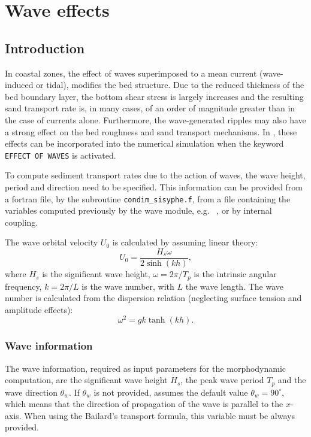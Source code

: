 \section{Wave effects}\label{ch:waves}
\subsection{Introduction}
In coastal zones, the effect of waves superimposed to a mean current (wave-induced or tidal), modifies the bed structure. Due to the reduced thickness of the bed boundary layer, the bottom
shear stress is largely increases and the resulting sand transport rate is, in many cases, of
an order of magnitude greater than in the case of currents alone. Furthermore, the wave-generated ripples may also have a strong effect on the bed roughness and sand transport mechanisms. In \sisyphe, these effects can be incorporated into the numerical simulation when the keyword \texttt{EFFECT OF WAVES} is activated.

To compute sediment transport rates due to the action of waves, the wave height, period and direction need to be specified. This information can be provided from a fortran file, by the subroutine \texttt{condim\_sisyphe.f}, from a file containing the variables computed previously by the wave module, e.g. \tomawac~\cite{reftomawac}, or by internal coupling.

The wave orbital velocity $U_0$ is calculated by \sisyphe assuming linear theory:
\begin{equation*}
U_0=\frac{H_s \omega }{2 \sinh (kh)}, 
\end{equation*}
where $H_s$ is the significant wave height, $\omega = 2\pi/T_p$ is the intrinsic angular frequency, $k = 2\pi/L$ is the wave number, with $L$ the wave length. The wave number is calculated from the dispersion relation (neglecting surface tension and amplitude effects):
\begin{equation*}
\omega^2 = gk\tanh (kh). 
\end{equation*}

\subsubsection{Wave information}
The wave information, required as input parameters for the morphodynamic
computation, are the significant wave height $H_s$, the peak wave
period $T_p$ and the wave direction $\theta_w$. If $\theta_w$ is not provided, 
\sisyphe assumes the default value $\theta_w = 90^\circ$, which means that the
direction of propagation of the wave is parallel to the $x$-axis. When using the 
Bailard's transport formula, this variable must be always provided.

